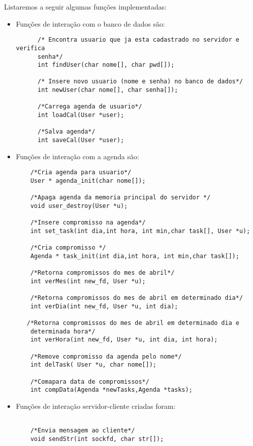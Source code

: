 \documentclass[10pt,a4paper]{article}
\begin{document}
  Listaremos a seguir algumas funções implementadas:
  \begin{itemize}
  \item  Funções de interação com o banco de dados são:
    \begin{lstlisting}
      /* Encontra usuario que ja esta cadastrado no servidor e verifica
      senha*/
      int findUser(char nome[], char pwd[]);
      
      /* Insere novo usuario (nome e senha) no banco de dados*/
      int newUser(char nome[], char senha[]);
      
      /*Carrega agenda de usuario*/
      int loadCal(User *user);
      
      /*Salva agenda*/
      int saveCal(User *user);
    \end{lstlisting}

  \item Funções de interação com a agenda  são:

   \begin{lstlisting}
    /*Cria agenda para usuario*/
    User * agenda_init(char nome[]);

    /*Apaga agenda da memoria principal do servidor */
    void user_destroy(User *u);

    /*Insere compromisso na agenda*/
    int set_task(int dia,int hora, int min,char task[], User *u);

    /*Cria compromisso */
    Agenda * task_init(int dia,int hora, int min,char task[]);

    /*Retorna compromissos do mes de abril*/
    int verMes(int new_fd, User *u);

    /*Retorna compromissos do mes de abril em determinado dia*/
    int verDia(int new_fd, User *u, int dia);
 
   /*Retorna compromissos do mes de abril em determinado dia e
    determinada hora*/
    int verHora(int new_fd, User *u, int dia, int hora);

    /*Remove compromisso da agenda pelo nome*/
    int delTask( User *u, char nome[]);

    /*Comapara data de compromissos*/
    int compData(Agenda *newTasks,Agenda *tasks);

  \end{lstlisting}

  \item Funções de interação servidor-cliente criadas foram:
  \begin{lstlisting}

    /*Envia mensagem ao cliente*/
    void sendStr(int sockfd, char str[]);


\end{lstlisting}
\end{itemize}
\end{document}
